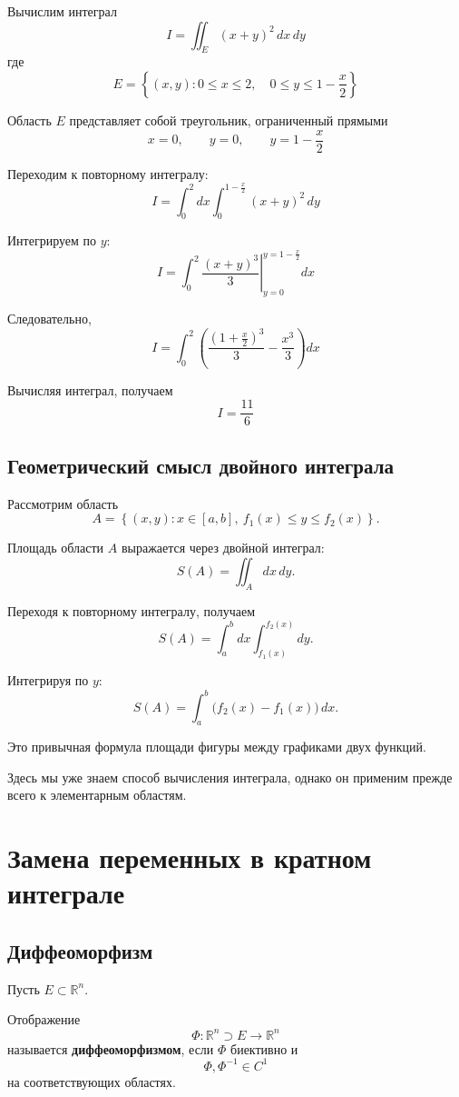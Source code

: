 \documentclass[12pt,a4paper]{article}
\begin{document}
\begin{example}
Вычислим интеграл
\[
I=\iint_E (x+y)^2\,dx\,dy
\]
где
\[
E=\left\{(x,y):
0\leq x\leq 2,\quad
0\leq y\leq 1-\frac{x}{2}\right\}
\]

Область $E$ представляет собой треугольник, ограниченный прямыми
\[
x=0,\qquad y=0,\qquad y=1-\frac{x}{2}
\]

Переходим к повторному интегралу:
\[
I=\int_0^2 dx
\int_0^{1-\frac{x}{2}}(x+y)^2\,dy
\]

Интегрируем по $y$:
\[
I=
\int_0^2
\left.
\frac{(x+y)^3}{3}
\right|_{y=0}^{y=1-\frac{x}{2}}dx
\]

Следовательно,
\[
I=
\int_0^2
\left(
\frac{\left(1+\frac{x}{2}\right)^3}{3}
-\frac{x^3}{3}
\right)dx
\]

Вычисляя интеграл, получаем
\[
I=\frac{11}{6}
\]
\end{example}

\subsection{Геометрический смысл двойного интеграла}

Рассмотрим область
\[
A=\left\{(x,y):
x\in[a,b],\
f_1(x)\leq y\leq f_2(x)\right\}.
\]

Площадь области $A$ выражается через двойной интеграл:
\[
S(A)=\iint_A dx\,dy.
\]

Переходя к повторному интегралу, получаем
\[
S(A)=
\int_a^b dx
\int_{f_1(x)}^{f_2(x)}dy.
\]

Интегрируя по $y$:
\[
S(A)=
\int_a^b
\bigl(f_2(x)-f_1(x)\bigr)\,dx.
\]

Это привычная формула площади фигуры между графиками двух функций.

Здесь мы уже знаем способ вычисления интеграла, однако он применим прежде всего к элементарным областям.

\newpage

\section{Замена переменных в кратном интеграле}

\subsection{Диффеоморфизм}

\begin{definition}
Пусть $E\subset\mathbb{R}^n$.

Отображение
\[
\Phi:\mathbb{R}^n\supset E\to\mathbb{R}^n
\]
называется \textbf{диффеоморфизмом}, если $\Phi$ биективно и
\[
\Phi,\Phi^{-1}\in C^1
\]
на соответствующих областях.
\end{definition}
\end{document}
